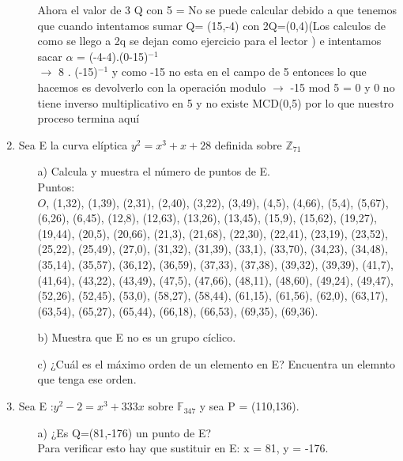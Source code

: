\documentclass[11pt,letterpaper]{article}
\begin{document}
\begin{enumerate}
\begin{itemize}
Ahora el valor de 3 Q con 5 =  No se puede calcular debido a que tenemos que cuando intentamos sumar Q= (15,-4) con 2Q=(0,4)(Los calculos de como se llego a 2q  se dejan como ejercicio para el lector ) e intentamos sacar $\alpha$ = (-4-4).(0-15)$^{-1}$\\
$\rightarrow$ 8 . (-15)$^{-1}$ y como -15 no esta en el campo de 5 entonces lo que hacemos es devolverlo con la operación modulo $\rightarrow$ -15 mod 5 = 0 y 0 no tiene inverso multiplicativo en 5 y no existe MCD(0,5) por lo que nuestro proceso termina aquí

\end{itemize}
\item Sea E la curva elíptica $y^{2} =x^{3}+x+28 $ definida sobre $\mathbb{Z}_{71}$
\begin{itemize}
\item[a)] Calcula y muestra el número de puntos de E.\\
Puntos:\\ $O$, (1,32),
(1,39),
(2,31),
(2,40),
(3,22),
(3,49),
(4,5),
(4,66),
(5,4),
(5,67),
(6,26),
(6,45),
(12,8),
(12,63),
(13,26),
(13,45),
(15,9),
(15,62),
(19,27),
(19,44),
(20,5),
(20,66),
(21,3),
(21,68),
(22,30),
(22,41),
(23,19),
(23,52),
(25,22),
(25,49),
(27,0),
(31,32),
(31,39),
(33,1),
(33,70),
(34,23),
(34,48),
(35,14),
(35,57),
(36,12),
(36,59),
(37,33),
(37,38),
(39,32),
(39,39),
(41,7),
(41,64),
(43,22),
(43,49),
(47,5),
(47,66),
(48,11),
(48,60),
(49,24),
(49,47),
(52,26),
(52,45),
(53,0),
(58,27),
(58,44),
(61,15),
(61,56),
(62,0),
(63,17),
(63,54),
(65,27),
(65,44),
(66,18),
(66,53),
(69,35),
(69,36).

\item[b)] Muestra que E no es un grupo cíclico.
\item[c)] ¿Cuál es el máximo orden de un elemento en E? Encuentra un elemnto que tenga ese orden.
\end{itemize}
\item Sea E :$y^{2}-2=x^{3}+333x$ sobre $\mathbb{F}_{347}$ y sea P = (110,136).
\begin{itemize}
\item[a)] ¿Es Q=(81,-176) un punto de E?\\
Para verificar esto hay que sustituir en E: x = 81, y = -176.\\


\end{itemize}
\end{enumerate}
\end{document}
